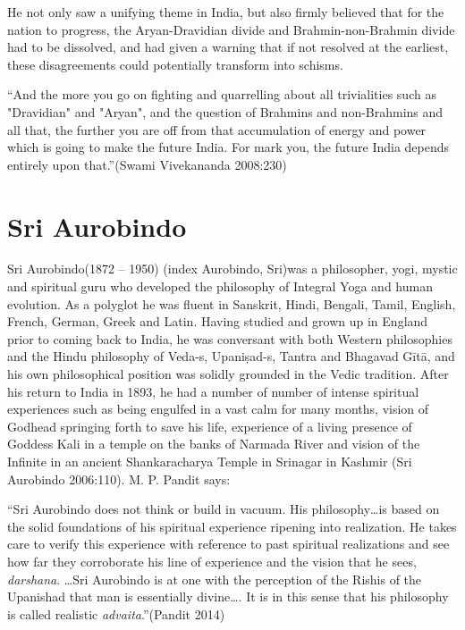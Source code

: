 He not only saw a unifying theme in India, but also firmly believed that for the nation to progress, the Aryan-Dravidian divide and Brahmin-non-Brahmin divide had to be dissolved, and had given a warning that if not resolved at the earliest, these disagreements could potentially transform into schisms.

\begin{myquote}
“And the more you go on fighting and quarrelling about all trivialities such as "Dravidian" and "Aryan", and the question of Brahmins and non-Brahmins and all that, the further you are off from that accumulation of energy and power which is going to make the future India. For mark you, the future India depends entirely upon that.”(Swami Vivekananda 2008:230)
\end{myquote}


\section*{Sri Aurobindo}

Sri Aurobindo(1872 – 1950) (index Aurobindo, Sri)was a philosopher, yogi, mystic and spiritual guru who developed the philosophy of Integral Yoga and human evolution. As a polyglot he was fluent in Sanskrit, Hindi, Bengali, Tamil, English, French, German, Greek and Latin. Having studied and grown up in England prior to coming back to India, he was conversant with both Western philosophies and the Hindu philosophy of Veda-s, Upaniṣad-s, Tantra and Bhagavad Gītā, and his own philosophical position was solidly grounded in the Vedic tradition. After his return to India in 1893, he had a number of number of intense spiritual experiences such as being engulfed in a vast calm for many months, vision of Godhead springing forth to save his life, experience of a living presence of Goddess Kali in a temple on the banks of Narmada River and vision of the Infinite in an ancient Shankaracharya Temple in Srinagar in Kashmir (Sri Aurobindo 2006:110). M. P. Pandit says:

\begin{myquote}
“Sri Aurobindo does not think or build in vacuum. His philosophy…is based on the solid foundations of his spiritual experience ripening into realization. He takes care to verify this experience with reference to past spiritual realizations and see how far they corroborate his line of experience and the vision that he sees, \textit{darshana}. …Sri Aurobindo is at one with the perception of the Rishis of the Upanishad that man is essentially divine…. It is in this sense that his philosophy is called realistic \textit{advaita}.”(Pandit 2014)
\end{myquote}


